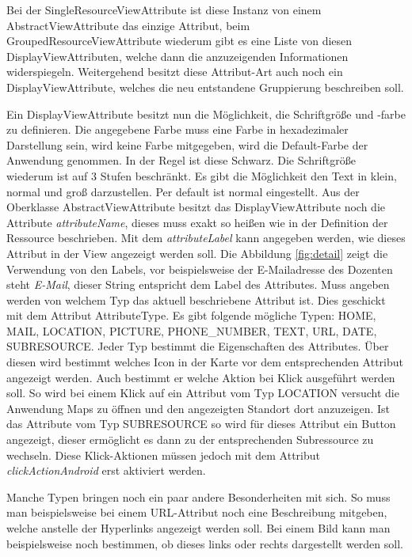 Bei der SingleResourceViewAttribute ist diese Instanz von einem AbstractViewAttribute das einzige Attribut, beim GroupedResourceViewAttribute wiederum gibt es eine Liste von diesen DisplayViewAttributen, welche dann die anzuzeigenden Informationen widerspiegeln. Weitergehend besitzt diese Attribut-Art auch noch ein DisplayViewAttribute, welches die neu entstandene Gruppierung beschreiben soll.

Ein DisplayViewAttribute besitzt nun die Möglichkeit, die Schriftgröße und -farbe zu definieren. Die angegebene Farbe muss eine Farbe in hexadezimaler Darstellung sein, wird keine Farbe mitgegeben, wird die Default-Farbe der Anwendung genommen. In der Regel ist diese Schwarz.  Die Schriftgröße wiederum ist auf 3 Stufen beschränkt. Es gibt die Möglichkeit den Text in klein, normal und groß darzustellen. Per default ist normal eingestellt. Aus der Oberklasse AbstractViewAttribute besitzt das DisplayViewAttribute noch die Attribute \textit{attributeName}, dieses muss exakt so heißen wie in der Definition der Ressource beschrieben.
Mit dem \textit{attributeLabel} kann angegeben werden, wie dieses Attribut in der View angezeigt werden soll. Die Abbildung \ref{fig:detail} zeigt die Verwendung von den Labels, vor beispielsweise der E-Mailadresse des Dozenten steht \textit{E-Mail}, dieser String entspricht dem Label des Attributes. Muss angeben werden von welchem Typ das aktuell beschriebene Attribut ist.
Dies geschickt mit dem Attribut AttributeType. Es gibt folgende mögliche Typen: HOME, MAIL, LOCATION, PICTURE, PHONE\_NUMBER, TEXT, URL, DATE, SUBRESOURCE. Jeder Typ bestimmt die Eigenschaften des Attributes. Über diesen wird bestimmt welches Icon in der Karte vor dem entsprechenden Attribut angezeigt werden. Auch bestimmt er welche Aktion bei Klick ausgeführt werden soll. So wird bei einem Klick auf ein Attribut vom Typ LOCATION versucht die Anwendung Maps zu öffnen und den angezeigten Standort dort anzuzeigen. Ist das Attribute vom Typ SUBRESOURCE so wird für dieses Attribut ein Button angezeigt, dieser ermöglicht es dann zu der entsprechenden Subressource zu wechseln. Diese Klick-Aktionen müssen jedoch mit dem Attribut \textit{clickActionAndroid} erst aktiviert werden.

Manche Typen bringen noch ein paar andere Besonderheiten mit sich. So muss man beispielsweise bei einem URL-Attribut noch eine Beschreibung mitgeben, welche anstelle der Hyperlinks angezeigt werden soll. Bei einem Bild kann man beispielsweise noch bestimmen, ob dieses links oder rechts dargestellt werden soll. 

